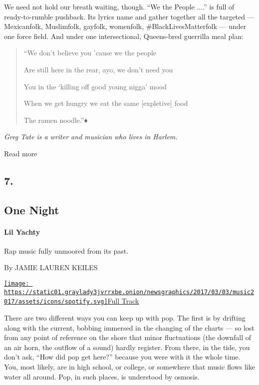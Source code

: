 We need not hold our breath waiting, though. ``We the People ....'' is
full of ready-to-rumble pushback. Its lyrics name and gather together
all the targeted --- Mexicanfolk, Muslimfolk, gayfolk, womenfolk,
\#BlackLivesMatterfolk --- under one force field. And under one
intersectional, Queens-bred guerrilla meal plan:

\begin{quote}
``We don't believe you 'cause we the people

Are still here in the rear, ayo, we don't need you

You in the `killing off good young nigga' mood

When we get hungry we eat the same {[}expletive{]} food

The ramen noodle.''♦
\end{quote}

\emph{Greg Tate is a writer and musician who lives in Harlem.}

Read more

\hypertarget{7}{%
\subsection{7.}\label{7}}

\hypertarget{--one-night}{%
\subsection{\texorpdfstring{ One
Night}{  One Night}}\label{--one-night}}

\hypertarget{lil-yachty}{%
\paragraph{Lil Yachty}\label{lil-yachty}}

Rap music fully unmoored from its past.

By JAMIE LAUREN KEILES

\href{https://open.spotify.com/track/40yJGQyEaBbIkXpwMFkXip}{\texttt{[image: https://static01.graylady3jvrrxbe.onion/newsgraphics/2017/03/03/music2017/assets/icons/spotify.svg]}Full
Track}

There are two different ways you can keep up with pop. The first is by
drifting along with the current, bobbing immersed in the changing of the
charts --- so lost from any point of reference on the shore that minor
fluctuations (the downfall of an air horn, the outflow of a sound)
hardly register. From there, in the tide, you don't ask, ``How did pop
get here?'' because you were with it the whole time. You, most likely,
are in high school, or college, or somewhere that music flows like water
all around. Pop, in such places, is understood by osmosis.


